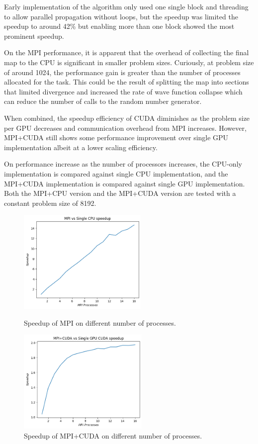 Early implementation of the algorithm only used one single block and threading to allow parallel propagation without loops, but the speedup was limited the speedup to around 42\% but enabling more than one block showed the most prominent speedup.

On the MPI performance, it is apparent that the overhead of collecting the final map to the CPU is significant in smaller problem sizes. Curiously, at problem size of around 1024, the performance gain is greater than the number of processes allocated for the task. This could be the result of splitting the map into sections that limited divergence and increased the rate of wave function collapse which can reduce the number of calls to the random number generator.

When combined, the speedup efficiency of CUDA diminishes as the problem size per GPU decreases and communication overhead from MPI increases. However, MPI+CUDA still shows some performance improvement over single GPU implementation albeit at a lower scaling efficiency.

On performance increase as the number of processors increases, the CPU-only implementation is compared against single CPU implementation, and the MPI+CUDA implementation is compared against single GPU implementation. Both the MPI+CPU version and the MPI+CUDA version are tested with a constant problem size of 8192. 

\begin{figure}[!htb]
    \centering
    \includegraphics[height=5cm]{images/MPI_speedup_more_processes.png}
    \caption{Speedup of MPI on different number of processes.}
    \endminipage\hfill
    \centering
    \includegraphics[height=5cm]{images/MPI_CUDA_speedup_more_processes.png}
    \caption{Speedup of MPI+CUDA on different number of processes.}
    \endminipage\hfill
    
\end{figure}

